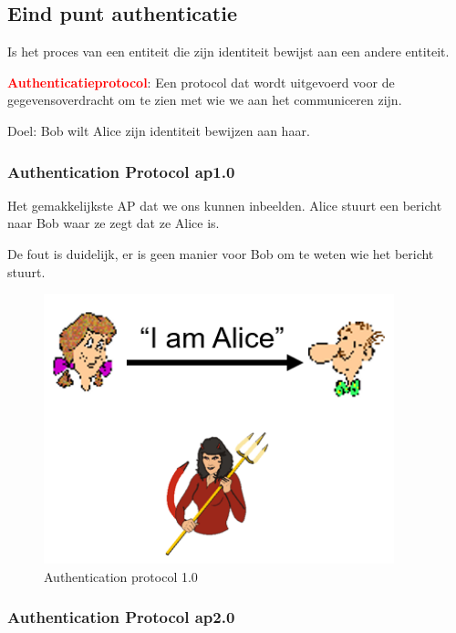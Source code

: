 \subsection{Eind punt authenticatie}

\noindent Is het proces van een entiteit die zijn identiteit bewijst aan een andere entiteit.

\noindent \textcolor{red}{\textbf{Authenticatieprotocol}}: Een protocol dat wordt uitgevoerd voor de gegevensoverdracht om te zien met wie we aan het communiceren zijn.

\noindent Doel: Bob wilt Alice zijn identiteit bewijzen aan haar.

\subsubsection{Authentication Protocol ap1.0}

\noindent Het gemakkelijkste AP dat we ons kunnen inbeelden. Alice stuurt een bericht naar Bob waar ze zegt dat ze Alice is.

\noindent De fout is duidelijk, er is geen manier voor Bob om te weten wie het bericht stuurt.


\begin{figure}[h]
    \centering
    \includegraphics[width=4in]{./img/imghfdst8/hfdst8puntje13.png}
    \caption{Authentication protocol 1.0}      
    \label{fig:Authentication protocol 1.0 }
\end{figure}

\subsubsection{Authentication Protocol ap2.0}

